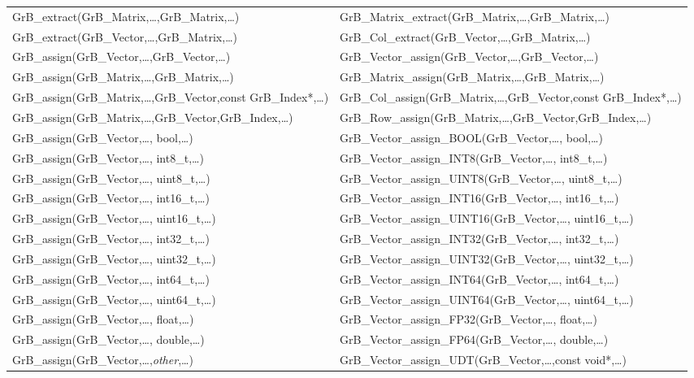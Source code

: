 \begin{table}[htb]
{\begin{tabular}{l|l}
{\sf GrB\_extract(GrB\_Matrix,\ldots,GrB\_Matrix,\ldots)}		& {\sf GrB\_Matrix\_extract(GrB\_Matrix,\ldots,GrB\_Matrix,\ldots)} \\
{\sf GrB\_extract(GrB\_Vector,\ldots,GrB\_Matrix,\ldots)}		& {\sf GrB\_Col\_extract(GrB\_Vector,\ldots,GrB\_Matrix,\ldots)} \\ \hline
{\sf GrB\_assign(GrB\_Vector,\ldots,GrB\_Vector,\ldots)}		& {\sf GrB\_Vector\_assign(GrB\_Vector,\ldots,GrB\_Vector,\ldots)} \\
{\sf GrB\_assign(GrB\_Matrix,\ldots,GrB\_Matrix,\ldots)}		& {\sf GrB\_Matrix\_assign(GrB\_Matrix,\ldots,GrB\_Matrix,\ldots)} \\
{\sf GrB\_assign(GrB\_Matrix,\ldots,GrB\_Vector,const GrB\_Index*,\ldots)}	& {\sf GrB\_Col\_assign(GrB\_Matrix,\ldots,GrB\_Vector,const GrB\_Index*,\ldots)} \\
{\sf GrB\_assign(GrB\_Matrix,\ldots,GrB\_Vector,GrB\_Index,\ldots)}	& {\sf GrB\_Row\_assign(GrB\_Matrix,\ldots,GrB\_Vector,GrB\_Index,\ldots)} \\ \hline
{\sf GrB\_assign(GrB\_Vector,\ldots, bool,\ldots)}		& {\sf GrB\_Vector\_assign\_BOOL(GrB\_Vector,\ldots, bool,\ldots)} \\
{\sf GrB\_assign(GrB\_Vector,\ldots, int8\_t,\ldots)}		& {\sf GrB\_Vector\_assign\_INT8(GrB\_Vector,\ldots, int8\_t,\ldots)} \\
{\sf GrB\_assign(GrB\_Vector,\ldots, uint8\_t,\ldots)}		& {\sf GrB\_Vector\_assign\_UINT8(GrB\_Vector,\ldots, uint8\_t,\ldots)} \\
{\sf GrB\_assign(GrB\_Vector,\ldots, int16\_t,\ldots)}		& {\sf GrB\_Vector\_assign\_INT16(GrB\_Vector,\ldots, int16\_t,\ldots)} \\
{\sf GrB\_assign(GrB\_Vector,\ldots, uint16\_t,\ldots)}		& {\sf GrB\_Vector\_assign\_UINT16(GrB\_Vector,\ldots, uint16\_t,\ldots)} \\
{\sf GrB\_assign(GrB\_Vector,\ldots, int32\_t,\ldots)}		& {\sf GrB\_Vector\_assign\_INT32(GrB\_Vector,\ldots, int32\_t,\ldots)} \\
{\sf GrB\_assign(GrB\_Vector,\ldots, uint32\_t,\ldots)}		& {\sf GrB\_Vector\_assign\_UINT32(GrB\_Vector,\ldots, uint32\_t,\ldots)} \\
{\sf GrB\_assign(GrB\_Vector,\ldots, int64\_t,\ldots)}		& {\sf GrB\_Vector\_assign\_INT64(GrB\_Vector,\ldots, int64\_t,\ldots)} \\
{\sf GrB\_assign(GrB\_Vector,\ldots, uint64\_t,\ldots)}		& {\sf GrB\_Vector\_assign\_UINT64(GrB\_Vector,\ldots, uint64\_t,\ldots)} \\
{\sf GrB\_assign(GrB\_Vector,\ldots, float,\ldots)}			& {\sf GrB\_Vector\_assign\_FP32(GrB\_Vector,\ldots, float,\ldots)} \\
{\sf GrB\_assign(GrB\_Vector,\ldots, double,\ldots)}		& {\sf GrB\_Vector\_assign\_FP64(GrB\_Vector,\ldots, double,\ldots)} \\
{\sf GrB\_assign(GrB\_Vector,\ldots,\emph{other},\ldots)}	& {\sf GrB\_Vector\_assign\_UDT(GrB\_Vector,\ldots,const void*,\ldots)} \\ \hline


\end{tabular}}
\end{table}
